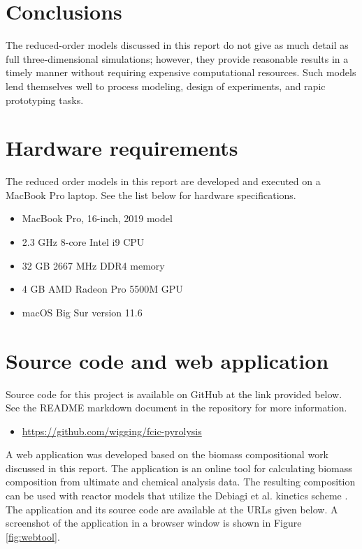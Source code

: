 
\section{Conclusions}

The reduced-order models discussed in this report do not give as much detail as full three-dimensional simulations; however, they provide reasonable results in a timely manner without requiring expensive computational resources. Such models lend themselves well to process modeling, design of experiments, and rapic prototyping tasks.

\section{Hardware requirements}

The reduced order models in this report are developed and executed on a MacBook Pro laptop. See the list below for hardware specifications.

\begin{itemize}
    \item MacBook Pro, 16-inch, 2019 model
    \item 2.3 GHz 8-core Intel i9 CPU
    \item 32 GB 2667 MHz DDR4 memory
    \item 4 GB AMD Radeon Pro 5500M GPU
    \item macOS Big Sur version 11.6
\end{itemize}

\section{Source code and web application}

Source code for this project is available on GitHub at the link provided below. See the README markdown document in the repository for more information.

\begin{itemize}
    \item \url{https://github.com/wigging/fcic-pyrolysis}
\end{itemize}

A web application was developed based on the biomass compositional work discussed in this report. The application is an online tool for calculating biomass composition from ultimate and chemical analysis data. The resulting composition can be used with reactor models that utilize the Debiagi et al. kinetics scheme \cite{Debiagi-2018}. The application and its source code are available at the URLs given below. A screenshot of the application in a browser window is shown in Figure \ref{fig:webtool}.

